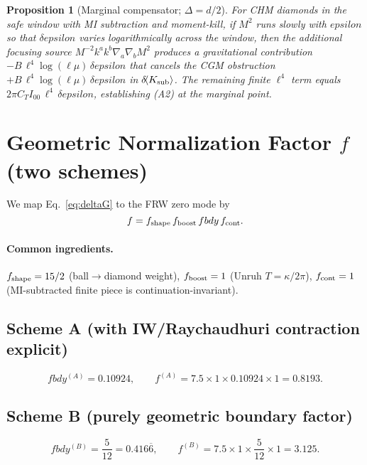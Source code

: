 \documentclass[aps,prd,onecolumn,superscriptaddress,nofootinbib]{revtex4-2}
\def\fbdy{fbdy}%
\def\eps{epsilon}%
\newcommand{\fbdy}{f_{\rm bdy}}
\newcommand{\eps}{\varepsilon}
\newtheorem{proposition}{Proposition}
\begin{document}
\begin{proposition}[Marginal compensator; \(\Delta=d/2\)]
\label{prop:marginal}
For CHM diamonds in the safe window with MI subtraction and moment-kill, if \(M^2\) runs slowly with \(\eps\) so that \(\delta\eps\) varies logarithmically across the window, then the additional focusing source \(M^{-2}k^a k^b\nabla_a\nabla_b M^2\) produces a gravitational contribution \(-B\,\ell^4\log(\ell\mu)\,\delta\eps\) that cancels the CGM obstruction \(+B\,\ell^4\log(\ell\mu)\,\delta\eps\) in \(\delta\!\langle K_{\rm sub}\rangle\). The remaining finite \(\ell^4\) term equals \(2\pi C_T I_{00}\,\ell^4\,\delta\eps\), establishing (A2) at the marginal point.
\end{proposition}

\section{Geometric Normalization Factor \texorpdfstring{$f$}{f} (two schemes)}
\label{sec:f-norm}
We map Eq.~\eqref{eq:deltaG} to the FRW zero mode by
\begin{equation}
f = f_{\rm shape}\, f_{\rm boost}\, \fbdy\, f_{\rm cont}.
\end{equation}

\paragraph*{Common ingredients.}
$f_{\rm shape}=15/2$ (ball$\to$diamond weight), $f_{\rm boost}=1$ (Unruh $T=\kappa/2\pi$), $f_{\rm cont}=1$ (MI-subtracted finite piece is continuation-invariant).

\subsection{Scheme A (with IW/Raychaudhuri contraction explicit)}
\[
\fbdy^{(A)}=0.10924,\qquad
f^{(A)}=7.5\times 1 \times 0.10924 \times 1=0.8193.
\]

\subsection{Scheme B (purely geometric boundary factor)}
\[
\fbdy^{(B)}=\frac{5}{12}=0.416\overline{6},\qquad
f^{(B)}=7.5\times 1 \times \frac{5}{12}\times 1=3.125.
\]
\end{document}
